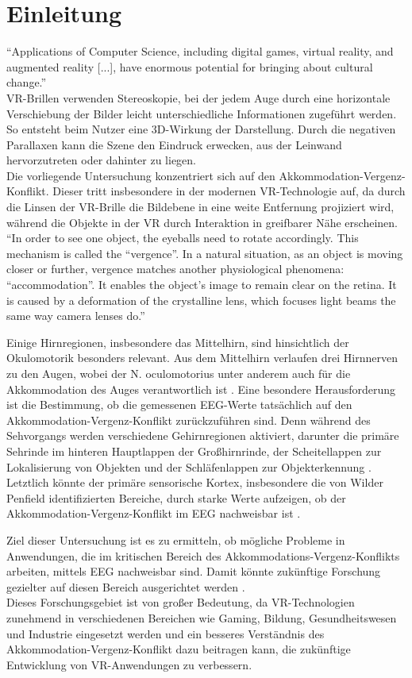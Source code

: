 \documentclass[conference]{IEEEtran}
\begin{document}
\section{Einleitung}
“Applications of Computer Science, including digital games, virtual reality, and augmented reality [...], have enormous potential for bringing about cultural change.”\cite{b2}\\
VR-Brillen verwenden Stereoskopie, bei der jedem Auge durch eine horizontale Verschiebung der Bilder leicht unterschiedliche Informationen zugeführt werden. So entsteht beim Nutzer eine 3D-Wirkung der Darstellung. Durch die negativen Parallaxen kann die Szene den Eindruck erwecken, aus der Leinwand hervorzutreten oder dahinter zu liegen.\cite{b3}\\
Die vorliegende Untersuchung konzentriert sich auf den Akkommodation-Vergenz-Konflikt. Dieser tritt insbesondere in der modernen VR-Technologie auf, da durch die Linsen der VR-Brille die Bildebene in eine weite Entfernung projiziert wird, während die Objekte in der VR durch Interaktion in greifbarer Nähe erscheinen.
“In order to see one object, the eyeballs need to rotate accordingly. This mechanism is called the “vergence”. In a natural situation, as an object is moving closer or further, vergence matches another physiological phenomena: “accommodation”. It enables the object’s image to remain clear on the retina. It is caused by a deformation of the crystalline lens, which focuses light beams the same way camera lenses do.”\cite{b4}

Einige Hirnregionen, insbesondere das Mittelhirn, sind hinsichtlich der Okulomotorik besonders relevant. Aus dem Mittelhirn verlaufen drei Hirnnerven zu den Augen, wobei der N. oculomotorius unter anderem auch für die Akkommodation des Auges verantwortlich ist \cite{b5}. Eine besondere Herausforderung ist die Bestimmung, ob die gemessenen EEG-Werte tatsächlich auf den Akkommodation-Vergenz-Konflikt zurückzuführen sind. Denn während des Sehvorgangs werden verschiedene Gehirnregionen aktiviert, darunter die primäre Sehrinde im hinteren Hauptlappen der Großhirnrinde, der Scheitellappen zur Lokalisierung von Objekten und der Schläfenlappen zur Objekterkennung \cite{b6}. Letztlich könnte der primäre sensorische Kortex, insbesondere die von Wilder Penfield identifizierten Bereiche, durch starke Werte aufzeigen, ob der Akkommodation-Vergenz-Konflikt im EEG nachweisbar ist \cite{b7}.

Ziel dieser Untersuchung ist es zu ermitteln, ob mögliche Probleme in Anwendungen, die im kritischen Bereich des Akkommodations-Vergenz-Konflikts arbeiten, mittels EEG nachweisbar sind. Damit könnte zukünftige Forschung gezielter auf diesen Bereich ausgerichtet werden \cite{b8}.\\
Dieses Forschungsgebiet ist von großer Bedeutung, da VR-Technologien zunehmend in verschiedenen Bereichen wie Gaming, Bildung, Gesundheitswesen und Industrie eingesetzt werden und ein besseres Verständnis des Akkommodation-Vergenz-Konflikt dazu beitragen kann, die zukünftige Entwicklung von VR-Anwendungen zu verbessern.
\end{document}
